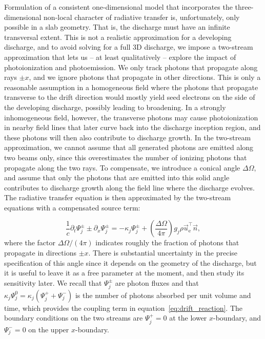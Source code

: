 \documentclass{iopjournal}
\newcommand{\e}{\ensuremath{\text{e}}}
\begin{document}
Formulation of a consistent one-dimensional model that incorporates the three-dimensional non-local character of radiative transfer is, unfortunately, only possible in a slab geometry.
That is, the discharge must have an infinite transversal extent.
This is not a realistic approximation for a developing discharge, and to avoid solving for a full 3D discharge, we impose a two-stream approximation that lets us -- at least qualitatively -- explore the impact of photoionization and photoemission.
We only track photons that propagate along rays $\pm x$, and we ignore photons that propagate in other directions.
This is only a reasonable assumption in a homogeneous field where the photons that propagate transverse to the drift direction would mostly yield seed electrons on the side of the developing discharge, possibly leading to broadening.
In a strongly inhomogeneous field, however, the transverse photons may cause photoionization in nearby field lines that later curve back into the discharge inception region, and these photons will then also contribute to discharge growth.
In the two-stream approximation, we cannot assume that all generated photons are emitted along two beams only, since this overestimates the number of ionizing photons that propagate along the two rays.
To compensate, we introduce a conical angle $\Delta\Omega$, and assume that only the photons that are emitted into this solid angle contributes to discharge growth along the field line where the discharge evolves.
The radiative transfer equation is then approximated by the two-stream equations with a compensated source term:

\begin{equation}
  \label{eq:two_stream}
  \frac{1}{c}\partial_t\Psi_j^{\pm} \pm\partial_x\Psi_j^{\pm} = -\kappa_j\Psi_j^{\pm} + \left(\frac{\Delta\Omega}{4\pi}\right)g_j\rho\vec{u}_\e^\intercal \vec{n},
\end{equation}
where the factor $\Delta\Omega/(4\pi)$ indicates roughly the fraction of photons that propagate in directions $\pm x$.
There is substantial uncertainty in the precise specification of this angle since it depends on the geometry of the discharge, but it is useful to leave it as a free parameter at the moment, and then study its sensitivity later.
We recall that $\Psi_j^\pm$ are photon fluxes and that $\kappa_j\Psi_j^0 = \kappa_j\left(\Psi_j^+ + \Psi^-_j\right)$ is the number of photons absorbed per unit volume and time, which provides the coupling term in equation~\eqref{eq:drift_reaction}.
The boundary conditions on the two streams are $\Psi_j^+ = 0$ at the lower $x$-boundary, and $\Psi_j^- = 0$ on the upper $x$-boundary.
\end{document}
